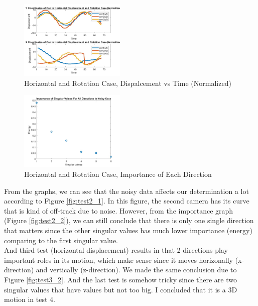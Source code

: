 \documentclass[twoside,twocolumn]{article}
\begin{document}
    \begin{figure}[h]
        \includegraphics[width = 0.45\textwidth]{test4_1.jpg}
        \caption{Horizontal and Rotation Case, Dispalcement vs Time (Normalized)}
        \label{fig:test4_1}
    \end{figure}
    \begin{figure}[h]
        \includegraphics[width = 0.45\textwidth]{test4_2.jpg}
        \caption{Horizontal and Rotation Case, Importance of Each Direction}
        \label{fig:test4_2}
    \end{figure}
    From the graphs, we can see that the noisy data affects our determination a lot according to Figure \ref{fig:test2_1}.
    In this figure, the second camera has its curve that is kind of off-track due to noise. However, from the importance 
    graph (Figure \ref{fig:test2_2}), we can still conclude that there is only one single direction that matters since the
    other singular values has much lower importance (energy) comparing to the first singular value. \\
    And third test (horizontal displacement) results in that 2 directions play important roles in its motion, which make 
    sense since it moves horizonally (x-direction) and vertically (z-direction). We made the same conclusion due to Figure
    \ref{fig:test3_2}. And the last test is somehow tricky since there are two singular values that have values but not
    too big. I concluded that it is a 3D motion in test 4.
\end{document}
